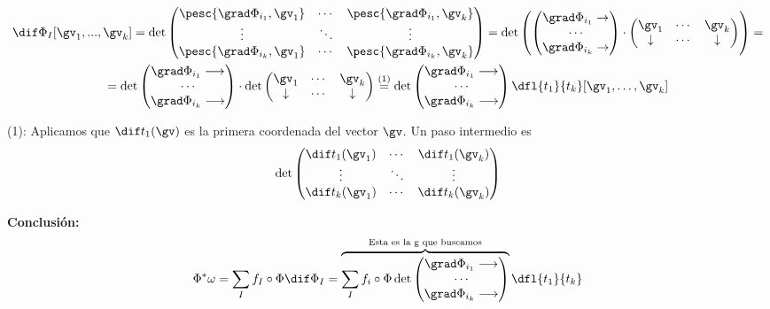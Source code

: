 \begin{gather*}
\dif \Phi_I[\gv_1,...,\gv_k] =
\det \begin{pmatrix}
	\pesc{\grad \Phi_{i_1},\gv_1} 	& \cdots & \pesc{\grad \Phi_{i_1},\gv_k}\\
	\vdots 							& \ddots & \vdots\\
	\pesc{\grad \Phi_{i_k},\gv_1} 	& \cdots & \pesc{\grad \Phi_{i_k},\gv_k} \\
\end{pmatrix} =
\det \left(\begin{pmatrix}
	\grad \Phi_{i_1} \rightarrow \\
	\cdots \\
	\grad \Phi_{i_k} \rightarrow
\end{pmatrix}
\cdot
\begin{pmatrix}
	\gv_1 		& \cdots & \gv_k\\
	\downarrow 	& \cdots & \downarrow
\end{pmatrix}\right) = \\
= \det\begin{pmatrix}
	\grad \Phi_{i_1} \longrightarrow \\
	\cdots \\
	\grad \Phi_{i_k} \longrightarrow
\end{pmatrix}
\cdot
\det \begin{pmatrix}
	\gv_1 		& \cdots & \gv_k \\
	\downarrow 	& \cdots & \downarrow
\end{pmatrix} \stackrel{(1)}{=}
\det\begin{pmatrix}
	\grad \Phi_{i_1} \longrightarrow \\
	\cdots \\
	\grad \Phi_{i_k} \longrightarrow
\end{pmatrix} \dfl{t_1}{t_k}[\gv_1,\dotsc,\gv_k]
\end{gather*}

(1): Aplicamos que $\dif t_1(\gv)$ es la primera coordenada del vector $\gv$. Un paso intermedio es \[\det \begin{pmatrix}
\dif t_1(\gv_1) & \cdots & \dif t_1(\gv_k)\\
\vdots 			& \ddots & \vdots\\
\dif t_k(\gv_1) & \cdots & \dif t_k(\gv_k)
\end{pmatrix} \]

\textbf{Conclusión:}
\[
\Phi^{\ast} \omega = \sum_I f_I\circ\Phi \dif \Phi_I =
\overbrace{\sum_I f_i\circ\Phi
\det\begin{pmatrix}
	\grad \Phi_{i_1} \longrightarrow \\
	\cdots \\
	\grad \Phi_{i_k} \longrightarrow
\end{pmatrix}}^{\text{Esta es la g que buscamos}} \dfl{t_1}{t_k}
\]

